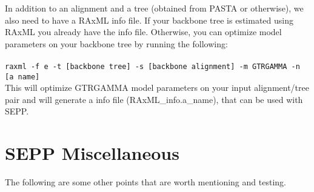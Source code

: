 \documentclass[11pt]{article} %
\newcommand{\sepp}{SEPP\xspace}
\newcommand{\ins}[1]{{\tt #1}}
\newcommand{\file}[1]{{\sf #1}}
\begin{document}
In addition to an alignment and a tree (obtained from PASTA or otherwise),
we also need to have a RAxML info file. If your backbone tree is estimated using
RAxML you already have the info file. Otherwise, you can optimize model parameters
on your backbone tree by running the following:\\\\
\ins{raxml -f e -t [backbone tree] -s [backbone alignment] -m GTRGAMMA -n [a name]}\\

This will optimize GTRGAMMA model parameters on your input alignment/tree pair and will
generate a info file (\file{RAxML\_info.a\_name}), that can be used with \sepp. 

\section{\sepp Miscellaneous }
The following are some other points that are worth mentioning and testing.
\end{document}
